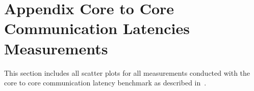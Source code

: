 %

\chapter{Appendix Core to Core Communication Latencies Measurements}
\label{app:core_to_core_latencies_complete}
This section includes all scatter plots for all measurements conducted with the core to core communication latency benchmark as described in~.


